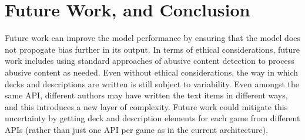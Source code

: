 \documentclass[10pt,twocolumn]{article}
\begin{document}
\section{Future Work, and Conclusion}

Future work can improve the model performance by ensuring that the model does not propogate bias further in its output. In terms of ethical considerations, future work includes using standard approaches of abusive content detection \cite{Mathew} to process abusive content as needed. Even without ethical considerations, the way in which decks and descriptions are written is still subject to variability. Even amongst the same API, different authors may have written the text items in different ways, and this introduces a new layer of complexity. Future work could mitigate this uncertainty by getting deck and description elements for each game from different APIs (rather than just one API per game as in the current architecture). 
\end{document}

